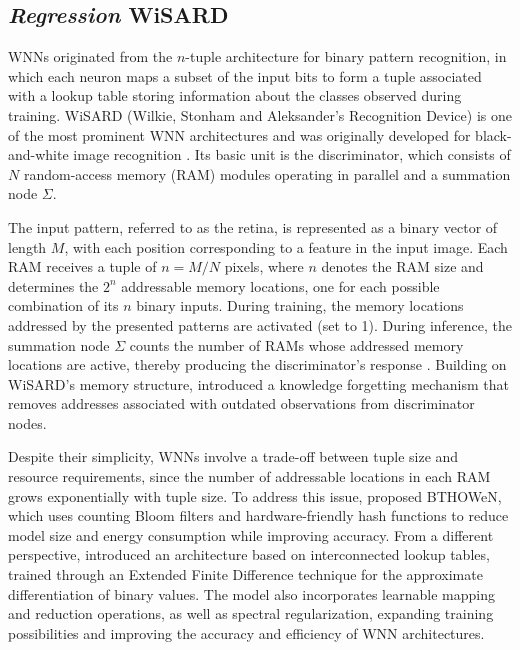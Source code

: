 \documentclass[final,3p,times,twocolumn,authoryear]{elsarticle}
\begin{document}
\subsection{\textit{Regression} WiSARD}
\label{sec_rew}

WNNs originated from the $n$-tuple architecture for binary pattern recognition, in which each neuron maps a subset of the input bits to form a tuple associated with a lookup table storing information about the classes observed during training. WiSARD (Wilkie, Stonham and Aleksander's Recognition Device) is one of the most prominent WNN architectures and was originally developed for black-and-white image recognition \citep{aleksander_wisard_1984}. Its basic unit is the discriminator, which consists of $N$ random-access memory (RAM) modules operating in parallel and a summation node $\Sigma$.

The input pattern, referred to as the retina, is represented as a binary vector of length $M$, with each position corresponding to a feature in the input image. Each RAM receives a tuple of $n = M/N$ pixels, where $n$ denotes the RAM size and determines the $2^n$ addressable memory locations, one for each possible combination of its $n$ binary inputs. During training, the memory locations addressed by the presented patterns are activated (set to 1). During inference, the summation node $\Sigma$ counts the number of RAMs whose addressed memory locations are active, thereby producing the discriminator's response \citep{aleksander_abrief_2009}. Building on WiSARD's memory structure, \citet{cardoso_clustering_2016} introduced a knowledge forgetting mechanism that removes addresses associated with outdated observations from discriminator nodes.

Despite their simplicity, WNNs involve a trade-off between tuple size and resource requirements, since the number of addressable locations in each RAM grows exponentially with tuple size. To address this issue, \citet{susskind_weightless_2022} proposed BTHOWeN, which uses counting Bloom filters and hardware-friendly hash functions to reduce model size and energy consumption while improving accuracy. From a different perspective, \citet{bacellar_differentiable_2024} introduced an architecture based on interconnected lookup tables, trained through an Extended Finite Difference technique for the approximate differentiation of binary values. The model also incorporates learnable mapping and reduction operations, as well as spectral regularization, expanding training possibilities and improving the accuracy and efficiency of WNN architectures.
\end{document}
